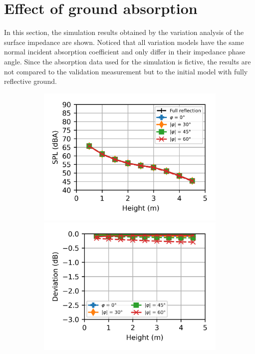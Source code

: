 \section{Effect of ground absorption}

In this section, the simulation results obtained by the variation analysis of the surface impedance are shown. Noticed that all variation models have the same normal incident absorption coefficient and only differ in their impedance phase angle. Since the absorption data used for the simulation is fictive, the results are not compared to the validation measurement but to the initial model with fully reflective ground.

\begin{figure}[H]
	\centering
	\begin{subfigure}[b]{\textwidth}
		\centering
		\includegraphics{fig/chap5/impedance/third_octave/SPL_100_Hz.png}
		\hfill
		\includegraphics{fig/chap5/impedance/third_octave/deviation_100_Hz.png}

\end{subfigure}
\end{figure}
